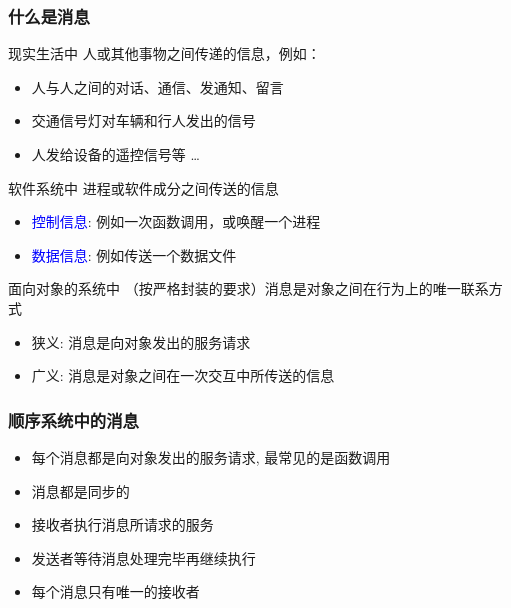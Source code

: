 \documentclass[compress]{beamer}
\begin{document}
\begin{frame}
  \frametitle{什么是消息}
   {
  \begin{block}{现实生活中}
    人或其他事物之间传递的信息，例如：
    \begin{itemize}
      \item 人与人之间的对话、通信、发通知、留言 \\
      \item 交通信号灯对车辆和行人发出的信号 \\
      \item 人发给设备的遥控信号等 \ldots
    \end{itemize}
  \end{block}
}

   {
  \begin{block}{软件系统中}
    进程或软件成分之间传送的信息
    \begin{itemize}
      \item \textcolor{blue}{控制信息}:  例如一次函数调用，或唤醒一个进程
      \item \textcolor{blue}{数据信息}:  例如传送一个数据文件
    \end{itemize}
  \end{block}
}

   {
  \begin{block}{面向对象的系统中}
    （按严格封装的要求）消息是对象之间在行为上的唯一联系方式 
    \begin{itemize}
      \item 狭义: 消息是向对象发出的服务请求 
      \item 广义: 消息是对象之间在一次交互中所传送的信息
    \end{itemize}
  \end{block}

}
\end{frame}

\begin{frame}
  \frametitle{顺序系统中的消息}
  \begin{itemize}
    \item 每个消息都是向对象发出的服务请求, 最常见的是函数调用
    \item 消息都是同步的
    \item 接收者执行消息所请求的服务
    \item 发送者等待消息处理完毕再继续执行
    \item 每个消息只有唯一的接收者
  \end{itemize}
\end{frame}
\end{document}
